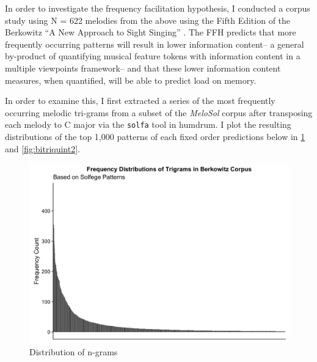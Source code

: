 \documentclass[12pt,]{book}
\begin{document}
In order to investigate the frequency facilitation hypothesis, I conducted a corpus study using N = 622 melodies from the above using the Fifth Edition of the Berkowitz ``A New Approach to Sight Singing'' \citep{berkowitzNewApproachSight2011}.
The FFH predicts that more frequently occurring patterns will result in lower information content-- a general by-product of quantifying musical feature tokens with information content in a multiple viewpoints framework-- and that these lower information content measures, when quantified, will be able to predict load on memory.

In order to examine this, I first extracted a series of the most frequently occurring melodic tri-grams from a subset of the \emph{MeloSol} corpus after transposing each melody to C major via the \texttt{solfa} tool in humdrum.
I plot the resulting distributions of the top 1,000 patterns of each fixed order predictions below in \ref{fig:bitriquint} and \ref{fig:bitriquint2}.

\begin{figure}

{\centering \includegraphics[width=1\linewidth]{img/trigrams} 

}

\caption{Distribution of n-grams}\label{fig:bitriquint}
\end{figure}
\end{document}
